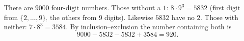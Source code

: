 There are $9000$ four-digit numbers. Those without a $1$: $8\cdot9^3=5832$ (first digit from $\{2,\dots,9\}$, the others from $9$ digits). Likewise $5832$ have no $2$. Those with neither: $7\cdot8^3=3584$. By inclusion--exclusion the number containing both is
\[9000-5832-5832+3584=\boxed{920}.\]
